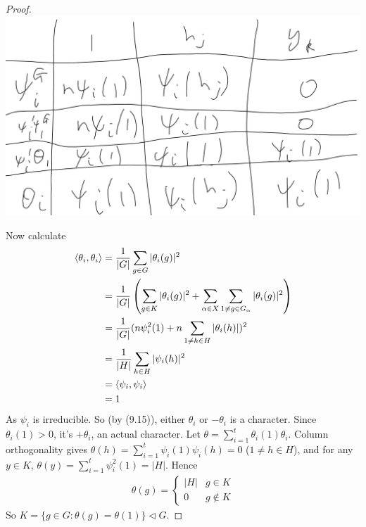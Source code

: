 \documentclass[a4paper]{article}
\begin{document}
\begin{thm}
\begin{proof}
\includegraphics[scale=0.5]{image/Rep_08.png}

Now calculate
\begin{equation*}
\begin{aligned}
\langle \theta_i ,\theta_i \rangle &= \frac{1}{|G|} \sum_{g \in G} |\theta_i(g)|^2\\
&= \frac{1}{|G|} \left(\sum_{g \in K} |\theta_i(g)|^2 + \sum_{\alpha \in X} \sum_{1 \neq g \in G_\alpha} |\theta_i(g)|^2\right)\\
&= \frac{1}{|G|} (n\psi_i^2 (1) + n \sum_{1 \neq h \in H} |\theta_i (h)|)^2\\
&= \frac{1}{|H|} \sum_{h \in H} |\psi_i(h)|^2\\
&= \langle \psi_i,\psi_i\rangle\\
&= 1
\end{aligned}
\end{equation*}
As $\psi_i$ is irreducible. So (by (9.15)), either $\theta_i$ or $-\theta_i$ is a character. Since $\theta_i(1) > 0$, it's $+\theta_i$, an actual character. Let $\theta = \sum_{i=1}^t \theta_i(1) \theta_i$. Column orthogonality gives $\theta(h) = \sum_{i=1}^t \psi_i(1) \psi_i(h) = 0$ ($1 \neq h \in H$), and for any $y \in K$, $\theta(y) = \sum_{i=1}^t \psi_i^2 (1) = |H|$. Hence
\begin{equation*}
\begin{aligned}
\theta(g) = \left\{\begin{array}{ll}
|H| & g \in K\\
0 & g \not\in K
\end{array}
\right.
\end{aligned}
\end{equation*}
So $K = \{g \in G : \theta(g) = \theta(1) \} \triangleleft G$.
\end{proof}
\end{thm}
\end{document}
